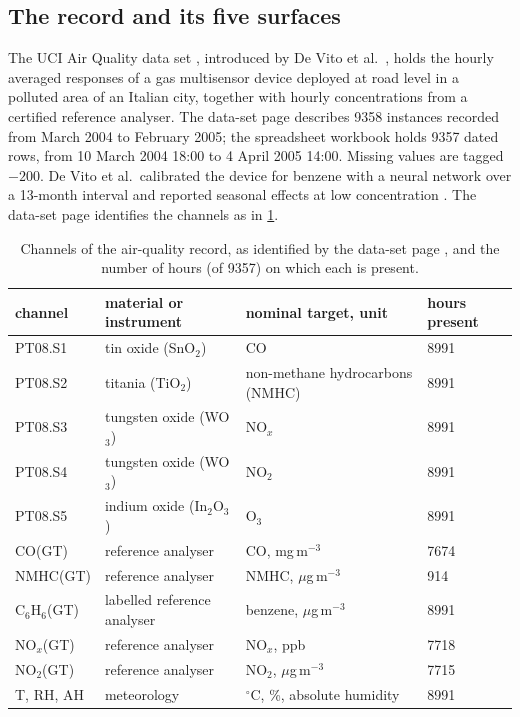 \documentclass[11pt]{article}
\theoremstyle{definition}\newtheorem{definition}[theorem]{Definition}
\theoremstyle{remark}\newtheorem{remark}[theorem]{Remark}
\begin{document}
\subsection{The record and its five surfaces}\label{sec:record}
The UCI Air Quality data set \cite{UCI}, introduced by De Vito et al.\ \cite{DeVito}, holds the hourly averaged responses of a gas multisensor device deployed at road level in a polluted area of an Italian city, together with hourly concentrations from a certified reference analyser. The data-set page describes 9358 instances recorded from March 2004 to February 2005; the spreadsheet workbook holds 9357 dated rows, from 10 March 2004 18:00 to 4 April 2005 14:00. Missing values are tagged $-200$. De Vito et al.\ calibrated the device for benzene with a neural network over a 13-month interval and reported seasonal effects at low concentration \cite{DeVito}. The data-set page identifies the channels as in \cref{tab:sensors}.

\begin{table}[htbp]\centering
\caption{Channels of the air-quality record, as identified by the data-set page \cite{UCI}, and the number of hours (of 9357) on which each is present.}\label{tab:sensors}
\small
\begin{tabular}{@{}llll@{}}\toprule
channel & material or instrument & nominal target, unit & hours present\\\midrule
PT08.S1 & tin oxide (SnO$_2$) & CO & 8991\\
PT08.S2 & titania (TiO$_2$) & non-methane hydrocarbons (NMHC) & 8991\\
PT08.S3 & tungsten oxide (WO$_3$) & NO$_x$ & 8991\\
PT08.S4 & tungsten oxide (WO$_3$) & NO$_2$ & 8991\\
PT08.S5 & indium oxide (In$_2$O$_3$) & O$_3$ & 8991\\
CO(GT) & reference analyser & CO, mg\,m$^{-3}$ & 7674\\
NMHC(GT) & reference analyser & NMHC, $\mu$g\,m$^{-3}$ & 914\\
C$_6$H$_6$(GT) & labelled reference analyser & benzene, $\mu$g\,m$^{-3}$ & 8991\\
NO$_x$(GT) & reference analyser & NO$_x$, ppb & 7718\\
NO$_2$(GT) & reference analyser & NO$_2$, $\mu$g\,m$^{-3}$ & 7715\\
T, RH, AH & meteorology & $^\circ$C, \%, absolute humidity & 8991\\\bottomrule
\end{tabular}
\end{table}
\end{document}
